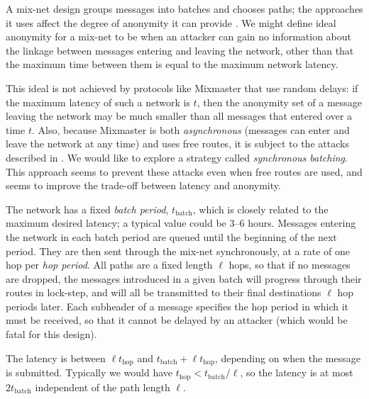 \documentclass[11pt]{IEEEtran}
\begin{document}

A mix-net design groups messages into batches and chooses paths; the
approaches it uses affect the degree of anonymity it can provide
\cite{batching-taxonomy}.
We might define ideal anonymity for a mix-net to be when an attacker can
gain no information about the linkage between messages entering and
leaving the network, other than that the maximum time between them is
equal to the maximum network latency.


This ideal is not achieved by protocols like Mixmaster that use random
delays: if the maximum latency of such a network is $t$, then the
anonymity set of a message leaving the network may be much smaller
than all messages that entered over a time $t$.
Also, because Mixmaster is both {\em asynchronous} (messages can enter and
leave the network at any time) and uses free routes, it is subject to
the attacks described in \cite{disad-free-routes}.
We would like to explore a
strategy called {\em synchronous batching}. This approach seems to prevent
these attacks even when free routes are used, and seems to improve the
trade-off between latency and anonymity.

The network has a fixed {\em batch period}, $t_\mathrm{batch}$, which is closely
related to the maximum desired latency; a typical value could be 3--6 hours.
Messages entering the network in each batch period are queued until
the beginning of the next period. They are then sent through the mix-net
synchronously, at a rate of one hop per {\em hop period}. All paths are
a fixed length $\ell$ hops, so that if no messages are dropped, the messages
introduced in a given batch will progress through their routes in
lock-step, and will all be transmitted to their final destinations $\ell$
hop periods later. Each subheader of a message specifies the hop
period in which it must be received, so that it cannot be delayed by an
attacker (which would be fatal for this design).

The latency is between $\ell t_\mathrm{hop}$ and $t_\mathrm{batch} +
\ell t_\mathrm{hop}$, depending on when the message is submitted.
Typically we would have $t_\mathrm{hop} < t_\mathrm{batch}/\ell$, so the
latency is at most $2t_\mathrm{batch}$ independent of the path length
$\ell$.
\end{document}
